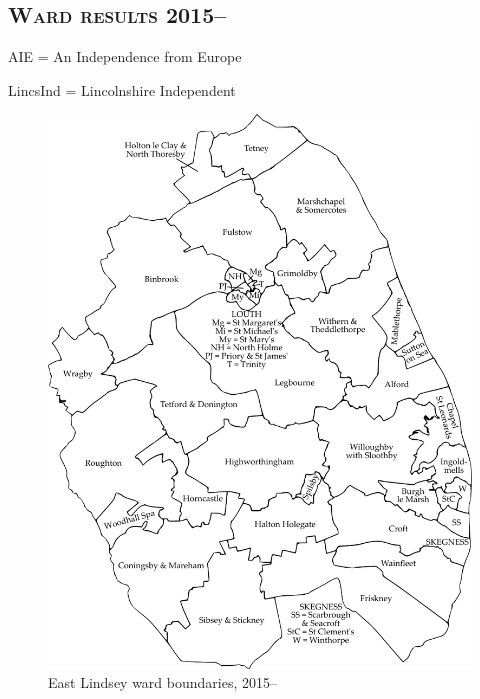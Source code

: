 \subsection*{\scshape Ward results 2015--}

AIE = An Independence from Europe

LincsInd = Lincolnshire Independent

\begin{figure}
\includegraphics[width=0.99\columnwidth]{source/e-lindsey15}
\caption{East Lindsey ward boundaries, 2015--}
\end{figure}

